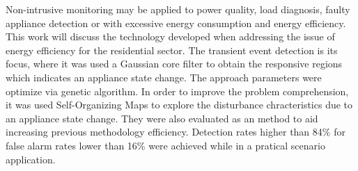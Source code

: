 \begin{foreignabstract}

Non-intrusive monitoring may be applied to power quality, load
diagnosis, faulty appliance detection or with excessive energy
consumption and energy efficiency. This work will discuss the
technology developed when addressing the issue of energy efficiency
for the residential sector. The transient event detection is its
focus, where it was used a Gaussian core filter to obtain the
responsive regions which indicates an appliance state change. The
approach parameters were optimize via genetic algorithm. In order to
improve the problem comprehension, it was used Self-Organizing Maps to
explore the disturbance chracteristics due to an appliance state
change. They were also evaluated as an method to aid increasing previous
methodology efficiency. Detection rates higher than 84\% for false
alarm rates lower than 16\% were achieved while in a pratical scenario
application.

\end{foreignabstract}

